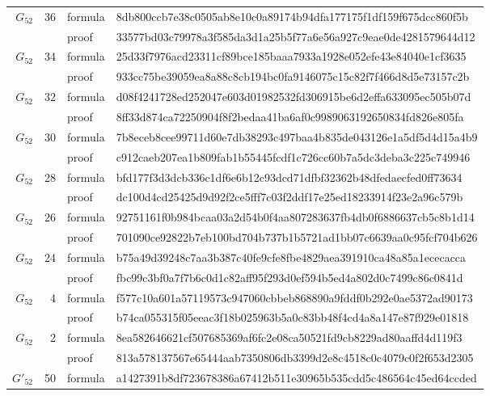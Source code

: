 \documentclass[11pt]{article}
\theoremstyle{definition}
\theoremstyle{remark}
\newcommand{\Ga}{G_{52}}
\newcommand{\Gb}{G'_{52}}
\begin{document}
\begin{longtable}{@{}rrll@{}}
$\Ga$ & 36 & formula & {\tiny\ttfamily 8db800ccb7e38c0505ab8e10c0a89174b94dfa177175f1df159f675dcc860f5b} \\
 & & proof & {\tiny\ttfamily 33577bd03c79978a3f585da3d1a25b5f77a6e56a927c9eae0de4281579644d12} \\
$\Ga$ & 34 & formula & {\tiny\ttfamily 25d33f7976acd23311cf89bce185baaa7933a1928e052efe43e84040e1cf3635} \\
 & & proof & {\tiny\ttfamily 933cc75be39059ea8a88c8cb194bc0fa9146075c15c82f7f466d8d5e73157c2b} \\
$\Ga$ & 32 & formula & {\tiny\ttfamily d08f4241728ed252047e603d01982532fd306915be6d2effa633095ec505b07d} \\
 & & proof & {\tiny\ttfamily 8ff33d874ca72250904f8f2bedaa41ba6af0c9989063192650834fd826e805fa} \\
$\Ga$ & 30 & formula & {\tiny\ttfamily 7b8eceb8cee99711d60e7db38293c497baa4b835de043126e1a5df5d4d15a4b9} \\
 & & proof & {\tiny\ttfamily c912caeb207ea1b809fab1b55445fcdf1c726cc60b7a5dc3deba3c225c749946} \\
$\Ga$ & 28 & formula & {\tiny\ttfamily bfd177f3d3dcb336c1df6e6b12c93dcd71dfbf32362b48dfedaecfed0ff73634} \\
 & & proof & {\tiny\ttfamily dc100d4cd25425d9d92f2ce5fff7c03f2ddf17e25ed18233914f23e2a96c579b} \\
$\Ga$ & 26 & formula & {\tiny\ttfamily 92751161f0b984bcaa03a2d54b0f4aa807283637fb4db0f6886637cb5c8b1d14} \\
 & & proof & {\tiny\ttfamily 701090ce92822b7eb100bd704b737b1b5721ad1bb07c6639aa0c95fcf704b626} \\
$\Ga$ & 24 & formula & {\tiny\ttfamily b75a49d39248c7aa3b387c40fe9cfe8fbe4829aea391910ca48a85a1ececacca} \\
 & & proof & {\tiny\ttfamily fbc99c3bf0a7f7b6c0d1c82aff95f293d0ef594b5ed4a802d0c7499c86c0841d} \\
$\Ga$ & 4 & formula & {\tiny\ttfamily f577c10a601a57119573c947060cbbeb868890a9fddf0b292e0ae5372ad90173} \\
 & & proof & {\tiny\ttfamily b74ca055315f05eeac3f18b025963b5a0c83bb48f4cd4a8a147e87f929e01818} \\
$\Ga$ & 2 & formula & {\tiny\ttfamily 8ea582646621cf507685369af6fc2e08ca50521fd9cb8229ad80aaffd4d119f3} \\
 & & proof & {\tiny\ttfamily 813a578137567e65444aab7350806db3399d2e8c4518c0c4079c0f2f653d2305} \\
$\Gb$ & 50 & formula & {\tiny\ttfamily a1427391b8df723678386a67412b511e30965b535cdd5c486564c45ed64ccded} \\

\end{longtable}
\end{document}
